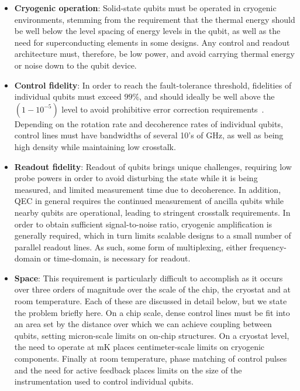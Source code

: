 \begin{itemize}
  \item \textbf{Cryogenic operation}: Solid-state qubits must be operated in cryogenic environments, stemming from the requirement that the thermal energy should be well below the level spacing of energy levels in the qubit, as well as the need for superconducting elements in some designs. Any control and readout architecture must, therefore, be low power, and avoid carrying thermal energy or noise down to the qubit device.
  \item \textbf{Control fidelity}: In order to reach the fault-tolerance threshold, fidelities of individual qubits must exceed $99\%$, and should ideally be well above the $(1 - 10^{-5})$ level to avoid prohibitive error correction requirements~\cite{6657074}. Depending on the rotation rate and decoherence rates of individual qubits, control lines must have bandwidths of several 10's of \si{\giga\hertz}, as well as being high density while maintaining low crosstalk.
  \item \textbf{Readout fidelity}: Readout of qubits brings unique challenges, requiring low probe powers in order to avoid disturbing the state while it is being measured, and limited measurement time due to decoherence. In addition, QEC in general requires the continued measurement of ancilla qubits while nearby qubits are operational, leading to stringent crosstalk requirements. In order to obtain sufficient signal-to-noise ratio, cryogenic amplification is generally required, which in turn limits scalable designs to a small number of parallel readout lines. As such, some form of multiplexing, either frequency-domain or time-domain, is necessary for readout.
  \item \textbf{Space}: This requirement is particularly difficult to accomplish as it occurs over three orders of magnitude over the scale of the chip, the cryostat and at room temperature. Each of these are discussed in detail below, but we state the problem briefly here. On a chip scale, dense control lines must be fit into an area set by the distance over which we can achieve coupling between qubits, setting micron-scale limits on on-chip structures. On a cryostat level, the need to operate at \si{\milli\kelvin} places centimeter-scale limits on cryogenic components. Finally at room temperature, phase matching of control pulses and the need for active feedback places limits on the size of the instrumentation used to control individual qubits.
\end{itemize}

